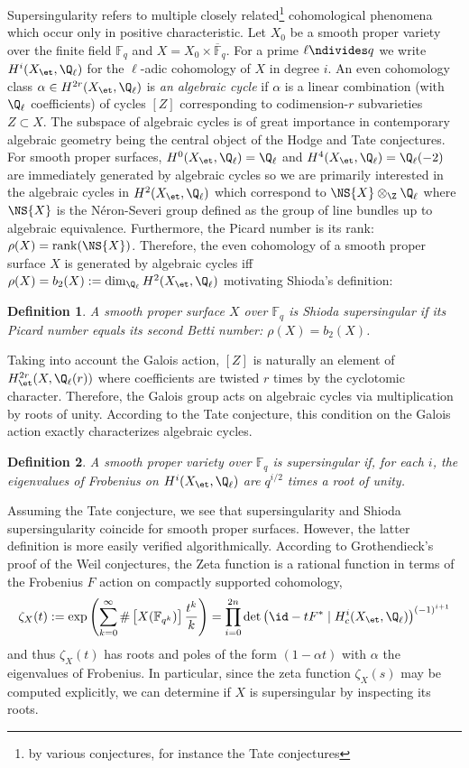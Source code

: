 \documentclass[10pt]{amsart}
\newtheorem*{defnn}{Definition}
\begin{document}
Supersingularity refers to multiple closely related\footnote{by various conjectures, for instance the Tate conjectures} cohomological phenomena which occur only in positive characteristic. Let $X_0$ be a smooth proper variety over the finite field $\mathbb{F}_q$ and $X = X_0 \times \overline{\mathbb{F}}_q$. For a prime $\ell \ndivides q$ we write $H^{i}(X_{\et}, \Q_\ell)$ for the $\ell$-adic \etale cohomology of $X$ in degree $i$. An even cohomology class $\alpha \in H^{2r}(X_{\et}, \Q_\ell)$ is \textit{an algebraic cycle} if $\alpha$ is a linear combination (with $\Q_\ell$ coefficients) of cycles $[Z]$ corresponding to codimension-$r$ subvarieties $Z \subset X$. The subspace of algebraic cycles is of great importance in contemporary algebraic geometry being the central object of the Hodge and Tate conjectures. For smooth proper surfaces, $H^0(X_{\et}, \Q_\ell) = \Q_\ell$ and $H^{4}(X_{\et}, \Q_\ell) = \Q_\ell(-2)$ are immediately generated by algebraic cycles so we are primarily interested in the algebraic cycles in $H^2(X_{\et}, \Q_\ell)$ which correspond to $\NS{X} \otimes_\Z \Q_\ell$ where $\NS{X}$ is the N\'{e}ron-Severi group defined as the group of line bundles up to algebraic equivalence. Furthermore, the Picard number is its rank: $\rho(X) = \mathrm{rank}(\NS{X})$. Therefore, the even cohomology of a smooth proper surface $X$ is generated by algebraic cycles iff $\rho(X) = b_2(X) := \dim_{\Q_\ell} H^2(X_{\et}, \Q_\ell)$ motivating Shioda's definition:

\begin{defnn}
A smooth proper surface $X$ over $\mathbb{F}_q$ is \textit{Shioda supersingular} if its Picard number equals its second Betti number: $\rho(X) = b_2(X)$.
\end{defnn} 
\noindent
Taking into account the Galois action, $[Z]$ is naturally an element of $H^{2r}_{\et}(X, \Q_\ell(r))$ where coefficients are twisted $r$ times by the cyclotomic character. Therefore, the Galois group acts on algebraic cycles via multiplication by roots of unity. According to the Tate conjecture, this condition on the Galois action exactly characterizes algebraic cycles.
\begin{defnn}
A smooth proper variety over $\mathbb{F}_q$ is \textit{supersingular} if, for each $i$, the eigenvalues of Frobenius on $H^{i}(X_{\et}, \Q_\ell)$ are $q^{i/2}$ times a root of unity.
\end{defnn}
\noindent
Assuming the Tate conjecture, we see that supersingularity and Shioda supersingularity coincide for smooth proper surfaces.
However, the latter definition is more easily verified algorithmically. According to Grothendieck's proof of the Weil conjectures, the Zeta function is a rational function in terms of the Frobenius $F$ action on compactly supported \etale cohomology,
\[ \zeta_X(t) := \exp{ \left( \sum_{k = 0}^\infty \# \left[ X(\mathbb{F}_{q^k}) \right] \frac{t^k}{k} \right)} = \prod_{i = 0}^{2n} \det{\left( \id - t F^* \mid H^{i}_c(X_{\et}, \Q_\ell) \right)}^{(-1)^{i + 1}} \]
and thus $\zeta_X(t)$ has roots and poles of the form $(1 - \alpha t)$ with $\alpha$ the eigenvalues of Frobenius. In particular, since the zeta function $\zeta_X(s)$ may be computed explicitly, we can determine if $X$ is supersingular by inspecting its roots.
\end{document}
